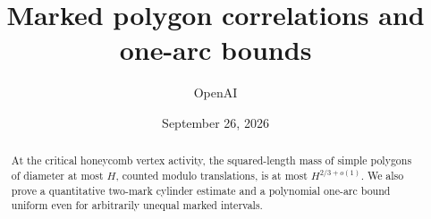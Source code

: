 \documentclass[11pt,oneside]{article}
\title{Marked polygon correlations and one-arc bounds}
\author{OpenAI}
\date{September 26, 2026}
\theoremstyle{definition}
\theoremstyle{remark}
\begin{document}
\maketitle
\begin{abstract}
At the critical honeycomb vertex activity, the squared-length mass of simple polygons of diameter at most $H$, counted modulo translations, is at most $H^{2/3+o(1)}$. We also prove a quantitative two-mark cylinder estimate and a polynomial one-arc bound uniform even for arbitrarily unequal marked intervals.
\end{abstract}
\tableofcontents








\end{document}
